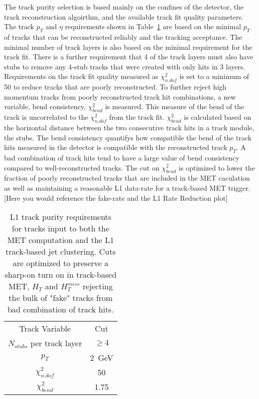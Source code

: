 The track purity selection is based mainly on the confines of the detector, the track reconstruction algoirthm, and  the available track fit quality parameters. The track $p_{T}$ and $\eta$ requirements shown in Table~\ref{tab:trkpurity} are based on the minimal $p_{T}$ of tracks that can be reconstructed reliably and the tracking acceptance. The minimal number of track layers is also based on the minimal requirement for the track fit. There is a further requirement that 4 of the track layers must also have stubs to remove any 4-stub tracks that were created with only hits in 3 layers. Requirements on the track fit quality measured as $\chi^{2}_{n.dof}$ is set to a minimum of 50 to reduce tracks that are poorly reconstructed. To further reject high momentum tracks from poorly reconstructed track hit combinations, a new variable, bend consistency, $\chi^{2}_{bend}$ is measured. This measure of the bend of the track is uncorrelated to the $\chi^{2}_{n.dof}$ from the track fit. $\chi^{2}_{bend}$ is calculated based on the horizontal distance between the two consecutive track hits in a track module, the stubs. The bend consistency quantifys how compatible the bend of the track hits measured in the detector is compatible with the reconstructed track $p_{T}$. A bad combination of track hits tend to have a large value of bend consistency compared to well-reconstructed tracks. The cut on $\chi^{2}_{bend}$ is optimized to lower the fraction of poorly reconstructed tracks that are included in the MET caculation as well as maintaining a reasonable L1 data-rate for a track-based MET trigger. [Here you would reference the fake-rate and the L1 Rate Reduction plot]
\begin{table}[h]
\begin{tabular}{|c|c|}
Track Variable & Cut\\
$N_{stubs}$ per track layer&$\geq 4$ \\
$p_{T}$ & 2~GeV \\
$\chi^{2}_{n.dof}$ & 50 \\
$\chi^{2}_{bend}$  & 1.75 \\

\end{tabular}
\caption{ L1 track purity requirements for tracks input to both the MET computation and the L1 track-based jet clustering. Cuts are optimized to preserve a sharp-on turn on in track-based MET, $H_{T}$ and $H^{miss}_{T}$ rejecting the bulk of "fake" tracks from bad combination of track hits.}
\label{tab:trkpurity}
\end{table}

